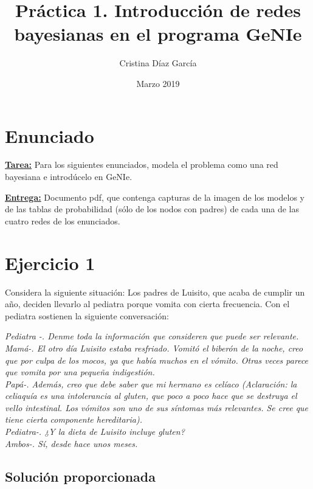 \documentclass{article}
\title{Práctica 1. Introducción de redes bayesianas en el programa GeNIe}
\author{Cristina Díaz García}
\date{Marzo 2019}
\begin{document}

\begin{titlingpage}
\maketitle
\end{titlingpage}

\newpage

\tableofcontents

\newpage

\section{Enunciado}

\textbf{\underline{Tarea:}} Para los siguientes enunciados, modela el problema como una red bayesiana e introdúcelo en GeNIe.

\textbf{\underline{Entrega:}} Documento pdf, que contenga capturas de la imagen de los modelos y de las tablas de probabilidad (sólo de los nodos con padres) de cada una de las cuatro redes de los enunciados.

\section{Ejercicio 1}

Considera la siguiente situación: Los padres de Luisito, que acaba de cumplir un año, deciden
llevarlo al pediatra porque vomita con cierta frecuencia. Con el pediatra sostienen la siguiente conversación:

\textit{Pediatra -. Denme toda la información que consideren que puede ser relevante.\\}
\textit{Mamá-. El otro día Luisito estaba resfriado. Vomitó el biberón de la noche, creo que por culpa de los mocos, ya que había muchos en el vómito. Otras veces parece que vomita por una pequeña indigestión.\\}
\textit{Papá-. Además, creo que debe saber que mi hermano es celíaco (Aclaración: la celiaquía es una intolerancia al gluten, que poco a poco hace que se destruya el vello intestinal. Los vómitos son uno de sus síntomas más relevantes. Se cree que tiene cierta componente hereditaria).\\}
\textit{Pediatra-. ¿Y la dieta de Luisito incluye gluten?\\}
\textit{Ambos-. Sí, desde hace unos meses.}

\subsection{Solución proporcionada}
\end{document}
